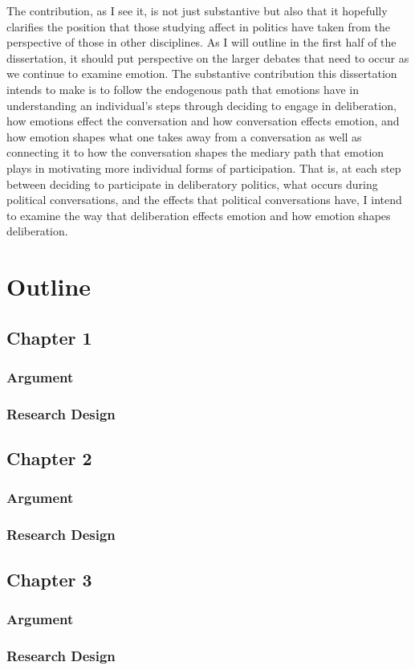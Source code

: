 \documentclass [12pt]{article}
\begin{document}
The contribution, as I see it, is not just substantive but also that it hopefully clarifies the position that those studying affect in politics have taken from the perspective of those in other disciplines. As I will outline in the first half of the dissertation, it should put perspective on the larger debates that need to occur as we continue to examine emotion. The substantive contribution this dissertation intends to make is to follow the endogenous path that emotions have in understanding an individual's steps through deciding to engage in deliberation, how emotions effect the conversation and how conversation effects emotion, and how emotion shapes what one takes away from a conversation as well as connecting it to how the conversation shapes the mediary path that emotion plays in motivating more individual forms of participation. That is, at each step between deciding to participate in deliberatory politics, what occurs during political conversations, and the effects that political conversations have, I intend to examine the way that deliberation effects emotion and how emotion shapes deliberation.

\section*{Outline}
    \subsection*{Chapter 1}
        \subsubsection*{Argument}
        \subsubsection*{Research Design}
    \subsection*{Chapter 2}
        \subsubsection*{Argument}
        \subsubsection*{Research Design}
    \subsection*{Chapter 3}
        \subsubsection*{Argument}
        \subsubsection*{Research Design}
\newpage


\end{document}
